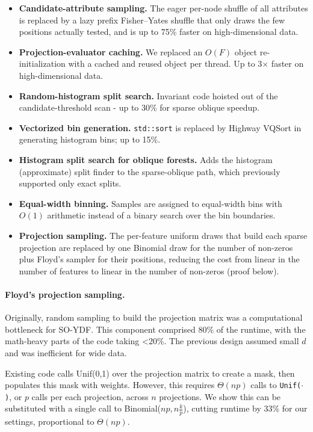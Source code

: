 \documentclass[sigconf,anonymous,review]{acmart}
\begin{document}
\begin{itemize}
    \item \textbf{Candidate-attribute sampling.} The eager per-node shuffle of all attributes is replaced by a lazy prefix Fisher--Yates shuffle that only draws the few positions actually tested, and is up to 75\% faster on high-dimensional data.
    \item \textbf{Projection-evaluator caching.} We replaced an $O(F)$ object re-initialization with a cached and reused object per thread. Up to 3$\times$ faster on high-dimensional data.
    \item \textbf{Random-histogram split search.} Invariant code hoisted out of the candidate-threshold scan - up to 30\% for sparse oblique speedup.
    \item \textbf{Vectorized bin generation.} \texttt{std::sort} is replaced by Highway VQSort in generating histogram bins; up to 15\%.
    \item \textbf{Histogram split search for oblique forests.} Adds the histogram (approximate) split finder to the sparse-oblique path, which previously supported only exact splits.
    \item \textbf{Equal-width binning.} Samples are assigned to equal-width bins with $O(1)$ arithmetic instead of a binary search over the bin boundaries.
    \item \textbf{Projection sampling.} The per-feature uniform draws that build each sparse projection are replaced by one Binomial draw for the number of non-zeros plus Floyd's sampler for their positions, reducing the cost from linear in the number of features to linear in the number of non-zeros (proof below).
\end{itemize}

\paragraph{Floyd's projection sampling.}
Originally, random sampling to build the projection matrix was a computational bottleneck for SO-YDF. This component comprised 80\% of the runtime, with the math-heavy parts of the code taking <20\%. The previous design assumed small $d$ and was inefficient for wide data.

Existing code calls Unif(0,1) over the projection matrix to create a mask, then populates this mask with weights. However, this requires $\Theta(np)$ calls to {\tt Unif($\cdot$)}, or $p$ calls per each projection, across $n$ projections. We show this can be substituted with a single call to Binomial($np, n\frac{k}{p}$), cutting runtime by 33\% for our settings, proportional to $\Theta(np)$.
\end{document}

